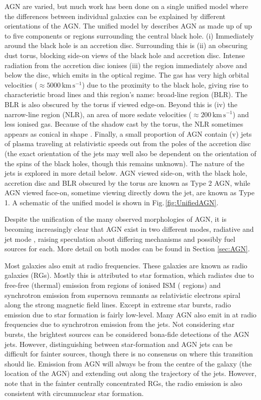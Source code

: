 	AGN are varied, but much work has been done on a single unified model where the differences between individual galaxies can be explained by different orientations of the AGN. The unified model by \citet{Antonucci1993} describes AGN as made up of up to five components or regions surrounding the central black hole. (i) Immediately around the black hole is an accretion disc. Surrounding this is (ii) an obscuring dust torus, blocking side-on views of the black hole and accretion disc. Intense radiation from the accretion disc ionises (iii) the region immediately above and below the disc, which emits in the optical regime. The gas has very high orbital velocities ($\approx 5000 \, \mathrm{km \, s^{-1}}$) due to the proximity to the black hole, giving rise to characteristic broad lines and this region's name: broad-line region (BLR). The BLR is also obscured by the torus if viewed edge-on. Beyond this is (iv) the narrow-line region (NLR), an area of more sedate velocities ($\approx 200 \, \mathrm{km \, s^{-1}}$) and less ionised gas. Because of the shadow cast by the torus, the NLR sometimes appears as conical in shape \citep{Wilson1994}. Finally, a small proportion of AGN contain (v) jets of plasma traveling at relativistic speeds out from the poles of the accretion disc (the exact orientation of the jets may well also be dependent on the orientation of the spins of the black holes, though this remains unknown). The nature of the jets is explored in more detail below. AGN viewed side-on, with the black hole, accretion disc and BLR obscured by the torus are known as Type 2 AGN, while AGN viewed face-on, sometime viewing directly down the jet, are known as Type 1. A schematic of the unified model is shown in Fig.\,\ref{fig:UnifiedAGN}.


	Despite the unification of the many observed morphologies of AGN, it is becoming increasingly clear that AGN exist in two different modes, radiative and jet mode \citep[e.g.][]{Antonucci2012}, raising speculation about differing mechanisms and possibly fuel sources for each. More detail on both modes can be found in Section \ref{sec:AGN}. 


	Most galaxies also emit at radio frequencies. These galaxies are known as radio galaxies (RGs). Mostly this is attributed to star formation, which radiates due to free-free (thermal) emission from regions of ionised ISM ( regions) and synchrotron emission from supernova remnants as relativistic electrons spiral along the strong magnetic field lines. Except in extreme star bursts, radio emission due to star formation is fairly low-level. Many AGN also emit in at radio frequencies due to synchrotron emission from the jets. Not considering star bursts, the brightest sources can be considered bona-fide detections of the AGN jets. However, distinguishing between star-formation and AGN jets can be difficult for fainter sources, though there is no consensus on where this transition should lie. Emission from AGN will always be from the centre of the galaxy (the location of the AGN) and extending out along the trajectory of the jets. However, \citet{Nyland2016} note that in the fainter centrally concentrated RGs, the radio emission is also consistent with circumnuclear star formation.

